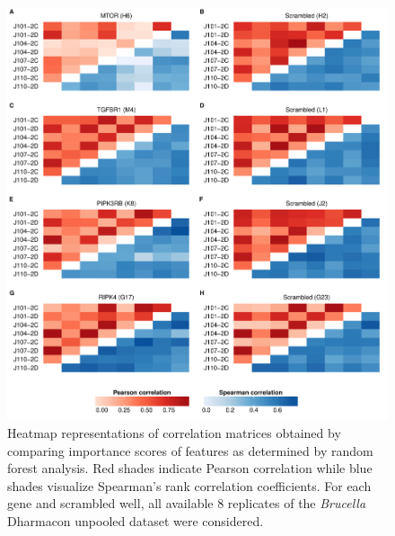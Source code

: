 \begin{knitrout}
\color{fgcolor}\begin{figure}

{\centering \includegraphics[width=\maxwidth]{figures/R/forest-corr-forest-corr-1} 

}

\caption[Heatmap representations of Pearson and Spearman correlation among feature importance scores obtained by random forest analysis.]{Heatmap representations of correlation matrices obtained by comparing importance scores of features as determined by random forest analysis. Red shades indicate Pearson correlation while blue shades visualize Spearman's rank correlation coefficients. For each gene and scrambled well, all available 8 replicates of the \textit{Brucella} Dharmacon unpooled dataset were considered.}\label{fig:forest-corr}
\end{figure}


\end{knitrout}

